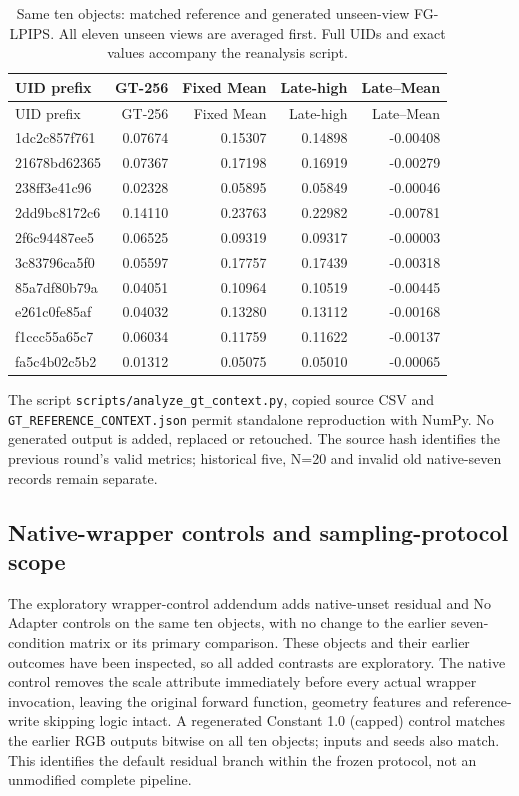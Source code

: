 \documentclass[11pt]{article}
\begin{document}
\begin{longtable}{lrrrr}
\caption{Same ten objects: matched reference and generated unseen-view FG-LPIPS. All eleven unseen views are averaged first. Full UIDs and exact values accompany the reanalysis script.}\\
\toprule UID prefix & GT-256 & Fixed Mean & Late-high & Late--Mean \\
\midrule\endfirsthead
\toprule UID prefix & GT-256 & Fixed Mean & Late-high & Late--Mean \\
\midrule\endhead
1dc2c857f761 & 0.07674 & 0.15307 & 0.14898 & -0.00408 \\
21678bd62365 & 0.07367 & 0.17198 & 0.16919 & -0.00279 \\
238ff3e41c96 & 0.02328 & 0.05895 & 0.05849 & -0.00046 \\
2dd9bc8172c6 & 0.14110 & 0.23763 & 0.22982 & -0.00781 \\
2f6c94487ee5 & 0.06525 & 0.09319 & 0.09317 & -0.00003 \\
3c83796ca5f0 & 0.05597 & 0.17757 & 0.17439 & -0.00318 \\
85a7df80b79a & 0.04051 & 0.10964 & 0.10519 & -0.00445 \\
e261c0fe85af & 0.04032 & 0.13280 & 0.13112 & -0.00168 \\
f1ccc55a65c7 & 0.06034 & 0.11759 & 0.11622 & -0.00137 \\
fa5c4b02c5b2 & 0.01312 & 0.05075 & 0.05010 & -0.00065 \\
\bottomrule\end{longtable}
The script \texttt{scripts/analyze\_gt\_context.py}, copied source CSV and \texttt{GT\_REFERENCE\_CONTEXT.json} permit standalone reproduction with NumPy. No generated output is added, replaced or retouched. The source hash identifies the previous round's valid metrics; historical five, N=20 and invalid old native-seven records remain separate.

\subsection*{Native-wrapper controls and sampling-protocol scope}
The exploratory wrapper-control addendum adds native-unset residual and No Adapter controls on the same ten objects, with no change to the earlier seven-condition matrix or its primary comparison. These objects and their earlier outcomes have been inspected, so all added contrasts are exploratory. The native control removes the scale attribute immediately before every actual wrapper invocation, leaving the original forward function, geometry features and reference-write skipping logic intact. A regenerated Constant 1.0 (capped) control matches the earlier RGB outputs bitwise on all ten objects; inputs and seeds also match. This identifies the default residual branch within the frozen protocol, not an unmodified complete pipeline.
\end{document}
